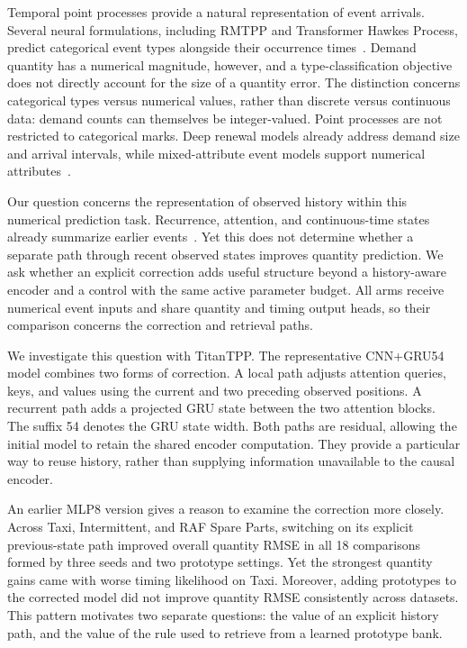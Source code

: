 \documentclass[runningheads]{llncs}
\newcommand{\method}{TitanTPP}
\begin{document}
Temporal point processes provide a natural representation of event arrivals. Several neural formulations, including RMTPP and Transformer Hawkes Process, predict categorical event types alongside their occurrence times~\cite{du2016rmtpp,zuo2020thp}. Demand quantity has a numerical magnitude, however, and a type-classification objective does not directly account for the size of a quantity error. The distinction concerns categorical types versus numerical values, rather than discrete versus continuous data: demand counts can themselves be integer-valued. Point processes are not restricted to categorical marks. Deep renewal models already address demand size and arrival intervals, while mixed-attribute event models support numerical attributes~\cite{turkmen2021renewal,draxler2025flextpp}.

Our question concerns the representation of observed history within this numerical prediction task. Recurrence, attention, and continuous-time states already summarize earlier events~\cite{mei2017nhp,yang2022anhp,chang2025s2p2}. Yet this does not determine whether a separate path through recent observed states improves quantity prediction. We ask whether an explicit correction adds useful structure beyond a history-aware encoder and a control with the same active parameter budget. All arms receive numerical event inputs and share quantity and timing output heads, so their comparison concerns the correction and retrieval paths.

We investigate this question with \method. The representative CNN+GRU54 model combines two forms of correction. A local path adjusts attention queries, keys, and values using the current and two preceding observed positions. A recurrent path adds a projected GRU state between the two attention blocks. The suffix 54 denotes the GRU state width. Both paths are residual, allowing the initial model to retain the shared encoder computation. They provide a particular way to reuse history, rather than supplying information unavailable to the causal encoder.

An earlier MLP8 version gives a reason to examine the correction more closely. Across Taxi, Intermittent, and RAF Spare Parts, switching on its explicit previous-state path improved overall quantity RMSE in all 18 comparisons formed by three seeds and two prototype settings. Yet the strongest quantity gains came with worse timing likelihood on Taxi. Moreover, adding prototypes to the corrected model did not improve quantity RMSE consistently across datasets. This pattern motivates two separate questions: the value of an explicit history path, and the value of the rule used to retrieve from a learned prototype bank.
\end{document}
